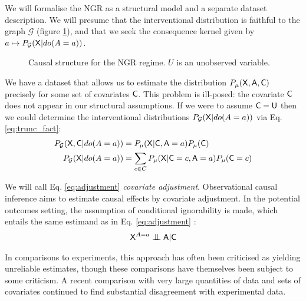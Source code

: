 We will formalise the NGR as a structural model and a separate dataset description. We will presume that the interventional distribution is faithful to the graph $\mathcal{G}$ (figure \ref{fig:NGR}), and that we seek the consequence kernel given by $a\mapsto P_\mathcal{G}(\mathsf{X}|do(A=a))$.

\begin{figure}[ht]
    \centering

    \caption{Causal structure for the NGR regime. $U$ is an unobserved variable.}
    \label{fig:NGR}
\end{figure}

We have a dataset that allows us to estimate the distribution $P_\mu(\mathsf{X},\mathsf{A},\mathsf{C})$ precisely for some set of covariates $\mathsf{C}$. This problem is ill-posed: the covariate $\mathsf{C}$ does not appear in our structural assumptions. If we were to assume $\mathsf{C}=\mathsf{U}$ then we could determine the interventional distributions $P_{\mathcal{G}}(\mathsf{X}|do(A=a))$ via Eq. \ref{eq:trunc_fact}:
\begin{align}
    P_{\mathcal{G}}(\mathsf{X},\mathsf{C}|do(A=a)) &= P_\mu(\mathsf{X}|\mathsf{C},\mathsf{A}=a) P_\mu(\mathsf{C})\\
    P_{\mathcal{G}}(\mathsf{X}|do(A=a)) &= \sum_{c\in C} P_\mu(\mathsf{X}|\mathsf{C}=c,\mathsf{A}=a) P_\mu(\mathsf{C}=c) \label{eq:adjustment}
\end{align}

We will call Eq. \ref{eq:adjustment} \emph{covariate adjustment}. Observational causal inference aims to estimate causal effects by covariate adjustment. In the potential outcomes setting, the assumption of conditional ignorability is made, which entails the same estimand as in Eq. \ref{eq:adjustment} \cite{imai_covariate_2014,rubin_causal_2005,dorie_automated_2017}:
\begin{align}
    \RV{X}^{A=a} \CI \RV{A} | \RV{C} \label{eq:PO_oci}
\end{align}

In comparisons to experiments, this approach has often been criticised as yielding unreliable estimates\cite{fraker_adequacy_1987,lalonde_evaluating_1986}, though these comparisons have themselves been subject to some criticism\cite{heckman_randomization_1991}. A recent comparison with very large quantities of data and sets of covariates continued to find substantial disagreement with experimental data\cite{gordon_comparison_2018}.


